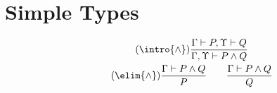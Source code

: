 \section{Simple Types}

\begin{gather}
    \tag{$\intro{\wedge}$}
    \frac{\Gamma \vdash P, \Upsilon \vdash Q}{\Gamma, \Upsilon \vdash P\wedge Q}\\
    \tag{$\elim{\wedge}$}
    \frac{\Gamma \vdash P\wedge Q}{P}
    \qquad
    \frac{\Gamma \vdash P\wedge Q}{Q}
\end{gather}